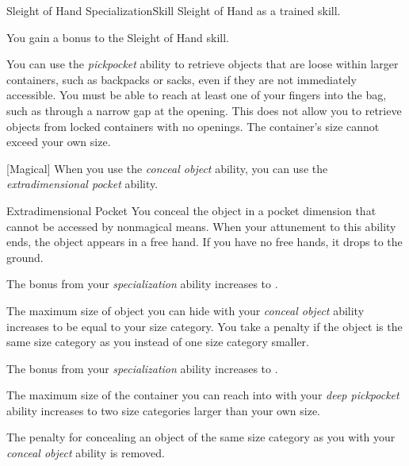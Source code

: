     \begin{feat}{Sleight of Hand Specialization}{Skill}
        \featpre Sleight of Hand as a trained skill.

         You gain a  bonus to the Sleight of Hand skill.

         You can use the \textit{pickpocket} ability to retrieve objects that are loose within larger containers, such as backpacks or sacks, even if they are not immediately accessible.
        You must be able to reach at least one of your fingers into the bag, such as through a narrow gap at the opening.
        This does not allow you to retrieve objects from locked containers with no openings.
        The container's size cannot exceed your own size.

        [Magical] When you use the \textit{conceal object} ability, you can use the \textit{extradimensional pocket} ability.
        \begin{attuneability}{Extradimensional Pocket}
            \rankline
            You conceal the object in a pocket dimension that cannot be accessed by nonmagical means.
            When your attunement to this ability ends, the object appears in a free hand.
            If you have no free hands, it drops to the ground.
        \end{attuneability}

         The bonus from your \textit{specialization} ability increases to .

         The maximum size of object you can hide with your \textit{conceal object} ability increases to be equal to your size category.
        You take a  penalty if the object is the same size category as you instead of one size category smaller.

         The bonus from your \textit{specialization} ability increases to .

         The maximum size of the container you can reach into with your \textit{deep pickpocket} ability increases to two size categories larger than your own size.

         The  penalty for concealing an object of the same size category as you with your \textit{conceal object} ability is removed.
    \end{feat}

